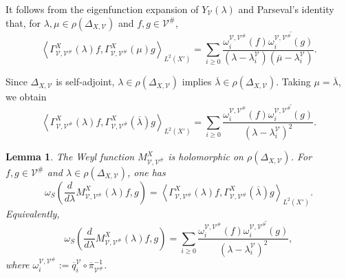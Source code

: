 \documentclass[12pt]{amsart}
\theoremstyle{plain}
\newtheorem{lem}[thm]{Lemma}
\theoremstyle{definition}
\theoremstyle{remark}
\numberwithin{equation}{section} \numberwithin{figure}{section}
\begin{document}
It follows from the eigenfunction expansion of
\(Y_{\mathcal V}(\lambda)\) and Parseval's identity that, for
\(\lambda,\mu\in\rho(\Delta_{X,\mathcal V})\) and
\(f,g\in\mathcal V^\#\),
\[
\left\langle
\Gamma_{\mathcal V,\mathcal V^\#}^{X}(\lambda)f,
\Gamma_{\mathcal V,\mathcal V^\#}^{X}(\mu)g
\right\rangle_{L^2(X')}
=
\sum_{i\geq0}
\frac{
\omega_i^{\mathcal V,\mathcal V^\#}(f)
\overline{\omega_i^{\mathcal V,\mathcal V^\#}(g)}
}{
(\lambda-\lambda_i^{\mathcal V})
(\overline{\mu}-\lambda_i^{\mathcal V})
}.
\]

Since \(\Delta_{X,\mathcal V}\) is self-adjoint,
\(\lambda\in\rho(\Delta_{X,\mathcal V})\) implies
\(\overline{\lambda}\in\rho(\Delta_{X,\mathcal V})\). Taking
\(\mu=\overline{\lambda}\), we obtain
\[
\left\langle
\Gamma_{\mathcal V,\mathcal V^\#}^{X}(\lambda)f,
\Gamma_{\mathcal V,\mathcal V^\#}^{X}(\overline{\lambda})g
\right\rangle_{L^2(X')}
=
\sum_{i\geq0}
\frac{
\omega_i^{\mathcal V,\mathcal V^\#}(f)
\overline{\omega_i^{\mathcal V,\mathcal V^\#}(g)}
}{
(\lambda-\lambda_i^{\mathcal V})^2
}.
\]


\begin{lem}\label{lem:M-derivative-identity}
The Weyl function
\(M_{\mathcal V,\mathcal V^\#}^{X}\) is holomorphic on
\(\rho(\Delta_{X,\mathcal V})\). For
\(f,g\in\mathcal V^\#\) and
\(\lambda\in\rho(\Delta_{X,\mathcal V})\), one has
\[
\omega_S\left(
\frac{d}{d\lambda}
M_{\mathcal V,\mathcal V^\#}^{X}(\lambda)f,g
\right)
=
\left\langle
\Gamma_{\mathcal V,\mathcal V^\#}^{X}(\lambda)f,
\Gamma_{\mathcal V,\mathcal V^\#}^{X}
(\overline{\lambda})g
\right\rangle_{L^2(X')}.
\]
Equivalently,
\[
\omega_S\left(
\frac{d}{d\lambda}
M_{\mathcal V,\mathcal V^\#}^{X}(\lambda)f,g
\right)
=
\sum_{i\geq0}
\frac{
\omega_i^{\mathcal V,\mathcal V^\#}(f)
\overline{\omega_i^{\mathcal V,\mathcal V^\#}(g)}
}{
(\lambda-\lambda_i^{\mathcal V})^2
},
\]
where
\(\omega_i^{\mathcal V,\mathcal V^\#}
:=
\overline{q}_i^{\mathcal V}
\circ\overline{\pi}_{\mathcal V^\#}^{-1}\).
\end{lem}
\end{document}
